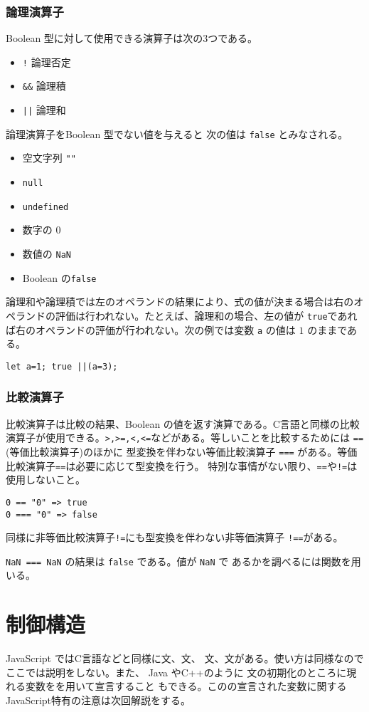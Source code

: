 \subsubsection{論理演算子}
Boolean 型に対して使用できる演算子は次の3つである。
\begin{itemize}
 \item \Verb+!+ 論理否定
 \item \Verb+&&+ 論理積
 \item \Verb+||+ 論理和
\end{itemize}
論理演算子をBoolean 型でない値を与えると
次の値は \Verb+false+ とみなされる。
\begin{itemize}
 \item 空文字列 \Verb+""+
 \item \Verb+null+
 \item \Verb+undefined+
 \item 数字の $0$
 \item 数値の \Verb+NaN+
 \item Boolean の\Verb+false+
\end{itemize}
論理和や論理積では左のオペランドの結果により、式の値が決まる場合は右のオ
ペランドの評価は行われない。たとえば、論理和の場合、左の値が
\Verb+true+であれば右のオペランドの評価が行われない。次の例では変数
\Verb+a+ の値は $1$ のままである。 
\begin{Verbatim}
let a=1; true ||(a=3); 
\end{Verbatim}
\subsubsection{比較演算子}
比較演算子は比較の結果、Boolean の値を返す演算である。C言語と同様の比較
演算子が使用できる。\texttt{>,>=,<,<=}などがある。等しいことを比較するためには
\Verb+==+(等価比較演算子)のほかに 型変換を伴わない等価比較演算子
\Verb+===+ がある。等価比較演算子\texttt{==}は必要に応じて型変換を行う。
特別な事情がない限り、\Verb+==+や\Verb+!=+は使用しないこと。
\begin{Verbatim}
0 == "0" => true
0 === "0" => false
\end{Verbatim}
同様に非等価比較演算子\texttt{!=}にも型変換を伴わない非等価演算子
\texttt{!==}がある。

\Verb+NaN === NaN+ の結果は \Verb+false+ である。値が \Verb+NaN+ で
あるかを調べるには関数を用いる。
\section{制御構造}
JavaScript ではC言語などと同様に文、文、
文、文がある。使い方は同様なのでここでは説明をしない。また、
Java やC++のように
文の初期化のところに現れる変数をを用いて宣言すること
もできる。このの宣言された変数に関するJavaScript特有の注意は次回解説をする。
